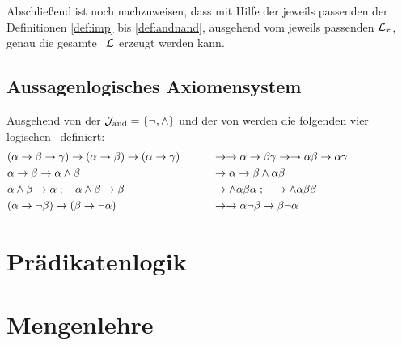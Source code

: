 Abschließend ist noch nachzuweisen, dass mit Hilfe der jeweils passenden der Definitionen \eqref{def:imp} bis \eqref{def:andnand}, ausgehend vom jeweils passenden $\mathcal{L}_x$, genau die gesamte \Formelmenge\ $\mathcal{L}$ erzeugt werden kann.

\subsection{Aussagenlogisches Axiomensystem}%
\label{sub:ausAxiome}

Ausgehend von der \logischenSignatur $\mathcal{J}_{\mathrm{and}} = \{\lnot, \land\}$ und der  von \chrqt{\symlimp} werden die folgenden vier logischen \Axiome\ definiert:
\begin{align}
	&
	(\alpha\rightarrow\beta\rightarrow\gamma)\rightarrow(\alpha\rightarrow\beta)\rightarrow(\alpha\rightarrow\gamma)
	&&&& &
	& \rightarrow\rightarrow\alpha\rightarrow\beta\gamma\rightarrow\rightarrow\alpha\beta\rightarrow\alpha\gamma \\
	& \alpha \rightarrow \beta \rightarrow \alpha \land \beta
	&&&& &
	& \rightarrow \alpha \rightarrow \beta \land \alpha \beta \\
	& \alpha \land \beta \rightarrow \alpha \;; \quad \alpha \land \beta \rightarrow \beta
	&&&& &
	& \rightarrow \land \alpha \beta \alpha \;; \quad \rightarrow \land \alpha \beta \beta\\
	&(\alpha \rightarrow \lnot \beta) \rightarrow (\beta \rightarrow \lnot \alpha)
	&&&& &
	& \rightarrow \rightarrow \alpha \lnot \beta \rightarrow \beta \lnot \alpha
	&&&&&&&&&&
\end{align}

\section{Prädikatenlogik}%
\label{sec:Prädikatenlogik}


\section{Mengenlehre}%
\label{sec:Mengenlehre}


\Endchapter
